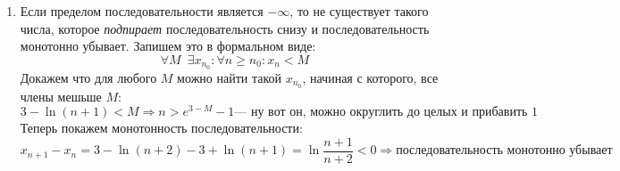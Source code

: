 \documentclass{report}
\begin{document}
\hfill

\sol

\begin{enumerate}
	 предела:
		\begin{equation*}
			\forall \epsilon > 0 \: \exists n_0 \in \mathbb{N}: \forall n \geq n_0: |A-x_n|< \epsilon
		\end{equation*}
		Тогда чтобы доказать что $1/2$ является пределом, нужно показать что:
		\begin{equation*}
			\left|\dfrac{1}{2}-\dfrac{3n-3}{6n-4}\right|<\epsilon
		\end{equation*}
		Те что $\left|\dfrac{1}{2}-\dfrac{3n-3}{6n-4}\right|$ может быть сколь угодно малым, покажем это:
		\begin{equation*}
			\left|\dfrac{1}{2}-\dfrac{3n-3}{6n-4}\right|=\dfrac{1}{6n-4} - \text{эта дробь может быть сколь угодно малой из принципа Архимеда}
		\end{equation*}
		\begin{center}
			\textbf{Ч.Т.Д.}
		\end{center}
	\item Если пределом последовательности является $-\infty$, то не существует такого числа, которое \textit{подпирает} последовательность снизу и последовательность монотонно убывает. Запишем это в формальном виде:
		\begin{equation*}
			\forall M \enspace \exists x_{n_0} : \forall n \geq n_0: x_n< M
		\end{equation*}
		Докажем что для любого $M$ можно найти такой $x_{n_0}$, начиная с которого, все члены мешьше $M$:
		\begin{equation*}
			3-\ln(n+1)<M \Rightarrow n>e^{3-M}-1  \text{--- ну вот он, можно округлить до целых и прибавить 1}
		\end{equation*}
		Теперь покажем монотонность последовательности:
		\begin{equation*}
			x_{n+1}-x_n=3-\ln{(n+2)}-3+\ln{(n+1)}=\ln{\dfrac{n+1}{n+2}}<0 \Rightarrow \text{последовательность монотонно убывает}

\end{equation*}
\end{enumerate}
\end{document}
